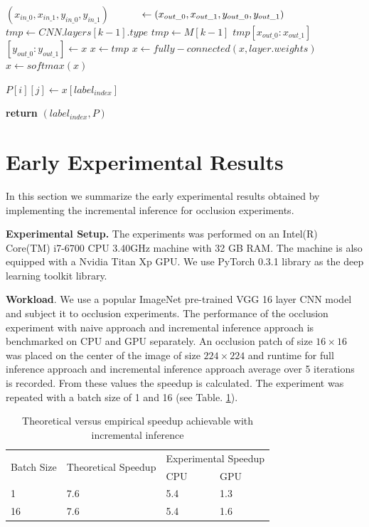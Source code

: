 \documentclass[10, sigconf]{acmart}
\begin{document}
\begin{algorithm}
\begin{algorithmic}[1]
            \State $(x_{in\_0}, x_{in\_1}, y_{in\_0}, y_{in\_1})$
            \State $\hspace{10mm} \gets (x_{out\_0}, x_{out\_1}, y_{out\_0}, y_{out\_1})$
            \State $tmp \gets CNN.layers[k-1].type$
              \State $tmp \gets M[k-1]$
              \State $tmp[x_{out\_0}:x_{out\_1}]$$[y_{out\_0}:y_{out\_1}]$$\gets x$
              \State $x \gets tmp$
            \EndIf
            \State $x \gets fully-connected(x, layer.weights)$
            \State $x \gets softmax(x)$
          \EndIf
      \EndFor

      \State $P[i][j] \gets x[label_{index}]$
      
  \EndFor
\EndFor

\State \textbf{return} $(label_{index}, P)$
\EndProcedure
\end{algorithmic}
\end{algorithm}

\section{Early Experimental Results}
In this section we summarize the early experimental results obtained by implementing the incremental inference for occlusion experiments.

\textbf{Experimental Setup.} The experiments was performed on an Intel(R) Core(TM) i7-6700 CPU 3.40GHz machine with 32 GB RAM. The machine is also equipped with a Nvidia Titan Xp GPU. We use PyTorch 0.3.1 library as the deep learning toolkit library.

\textbf{Workload}. We use a popular ImageNet pre-trained VGG 16 layer CNN model and subject it to occlusion experiments. The performance of the occlusion experiment with naive approach and incremental inference approach is benchmarked on CPU and GPU separately.
An occlusion patch of size $16\times16$ was placed on the center of the image of size $224\times224$ and runtime for full inference approach and incremental inference approach average over 5 iterations is recorded. From these values the speedup is calculated. The experiment was repeated with a batch size of 1 and 16 (see Table. \ref{table:speedup}).

\begin{table}[h]
\centering
\begin{tabular}{|l|l|l|l|}
\hline
\multirow{2}{*}{Batch Size} & \multirow{2}{*}{Theoretical Speedup} & \multicolumn{2}{l|}{Experimental Speedup} \\ \cline{3-4} 
 &  & CPU & GPU \\ \hline
1 & 7.6 & 5.4 & 1.3 \\ \hline
16 & 7.6 & 5.4 & 1.6 \\ \hline
\end{tabular}
\caption{Theoretical versus empirical speedup achievable with incremental inference}
\label{table:speedup}
\end{table}
\vspace{-5.mm}
\end{document}
